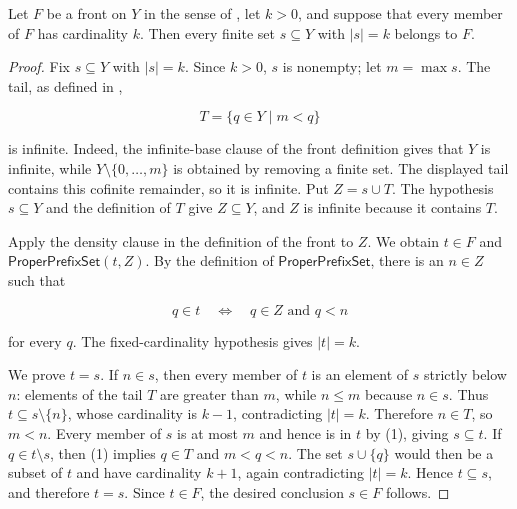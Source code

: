 \begin{helper}
Let $F$ be a front on $Y$ in the sense of , let $k>0$, and suppose that every member of $F$
has cardinality $k$.  Then every finite set $s\subseteq Y$ with
$|s|=k$ belongs to $F$.
\end{helper}
\begin{proof}
Fix $s\subseteq Y$ with $|s|=k$.  Since $k>0$, $s$ is nonempty; let
$m=\max s$.  The tail, as defined in ,

\[
T=\{q\in Y\mid m<q\}
\]

is infinite.  Indeed, the infinite-base clause of the front definition gives
that $Y$ is infinite, while $Y\setminus\{0,\ldots,m\}$ is obtained by
removing a finite set.  The displayed tail contains this cofinite remainder,
so it is infinite.  Put $Z=s\cup T$.  The hypothesis $s\subseteq Y$ and the
definition of $T$ give $Z\subseteq Y$, and $Z$ is infinite because it contains
$T$.

Apply the density clause in the definition of the front to $Z$.  We obtain
$t\in F$ and $\mathsf{ProperPrefixSet}(t,Z)$.  By the definition of
$\mathsf{ProperPrefixSet}$, there is an $n\in Z$ such that

\[
q\in t\quad\Longleftrightarrow\quad q\in Z\text{ and }q<n
\tag{1}
\]

for every $q$.  The fixed-cardinality hypothesis gives $|t|=k$.

We prove $t=s$.  If $n\in s$, then every member of $t$ is an element of
$s$ strictly below $n$: elements of the tail $T$ are greater than $m$, while
$n\le m$ because $n\in s$.  Thus $t\subseteq s\setminus\{n\}$, whose
cardinality is $k-1$, contradicting $|t|=k$.  Therefore $n\in T$, so
$m<n$.  Every member of $s$ is at most $m$ and hence is in $t$ by (1), giving
$s\subseteq t$.  If $q\in t\setminus s$, then (1) implies $q\in T$ and
$m<q<n$.  The set $s\cup\{q\}$ would then be a subset of $t$ and have
cardinality $k+1$, again contradicting $|t|=k$.  Hence $t\subseteq s$, and
therefore $t=s$.  Since $t\in F$, the desired conclusion $s\in F$ follows.
\end{proof}
